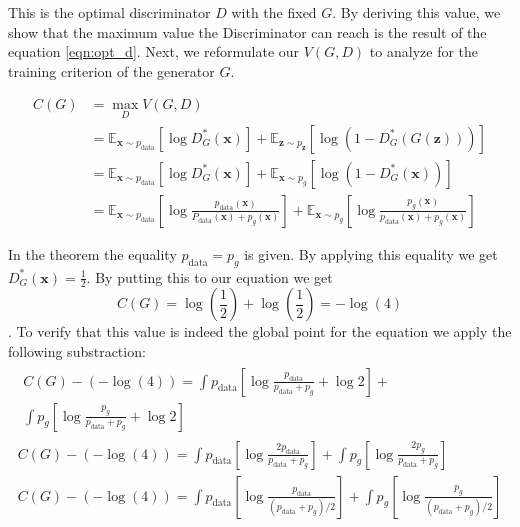 This is the optimal discriminator $D$ with the fixed $G$. By deriving this value, we show that the
maximum value the Discriminator can reach is the result of the equation \ref{eqn:opt_d}. Next, we reformulate our
$V(G, D)$ to analyze for the training criterion of the generator $G$. 

\begin{align}
    C(G) &= \max _{D} V(G, D) \\[5pt]
    & =\mathbb{E}_{\boldsymbol{x} \sim p_{\mathrm{data}}}\left[\log D_{G}^{*}(\boldsymbol{x})\right]+\mathbb{E}_{\boldsymbol{z} \sim p_{\boldsymbol{z}}}\left[\log \left(1-D_{G}^{*}(G(\boldsymbol{z}))\right)\right] \\[5pt]
    & =\mathbb{E}_{\boldsymbol{x} \sim p_{\mathrm{data}}}\left[\log D_{G}^{*}(\boldsymbol{x})\right]+\mathbb{E}_{\boldsymbol{x} \sim p_{g}}\left[\log \left(1-D_{G}^{*}(\boldsymbol{x})\right)\right] \\[5pt]
    & =\mathbb{E}_{\boldsymbol{x} \sim p_{\mathrm{data}}}\left[\log \frac{p_{\mathrm{data}}(\boldsymbol{x})}{P_{\mathrm{data}}(\boldsymbol{x})+p_{g}(\boldsymbol{x})}\right]+\mathbb{E}_{\boldsymbol{x} \sim p_{g}}\left[\log \frac{p_{g}(\boldsymbol{x})}{p_{\mathrm{data}}(\boldsymbol{x})+p_{g}(\boldsymbol{x})}\right] 
\end{align}

In the theorem the equality $ p_{\text{data}} = p_g$ is given. By applying this equality we get
$D^{*}_G(\boldsymbol{x}) = \frac{1}{2}$. By putting this to our equation we get $$C(G) =
\log(\frac{1}{2}) + \log(\frac{1}{2}) = - \log(4)$$. To verify that this value is indeed the global
point for the equation we apply the following substraction: 
\begin{multline}
    \label{eqn:gan_optim_proof}
    \begin{split}
        C(G)-(-\log (4))  =\int p_{\text {data}}\left[\log \frac{p_{\text {data}}}{p_{\text {data}}+p_{g}}+\log 2\right]+\\ \int p_{g}\left[\log \frac{p_{g}}{p_{\text {data}}+p_{g}}+\log 2\right]
    \end{split}\\[5pt]
    C(G)-(-\log (4)) =\int p_{\text {data}}\left[\log \frac{2 p_{\text {data}}}{p_{\text {data}}+p_{g}}\right]+\int p_{g}\left[\log \frac{2 p_{g}}{p_{\text {data}}+p_{g}}\right]\\[5pt]
    C(G)-(-\log (4)) =\int p_{\text {data}}\left[\log \frac{p_{\text {data}}}{\left(p_{\text {data}}+p_{g}\right) / 2}\right]+\int p_{g}\left[\log \frac{p_{g}}{\left(p_{\text {data}}+p_{g}\right) / 2}\right]
\end{multline}

